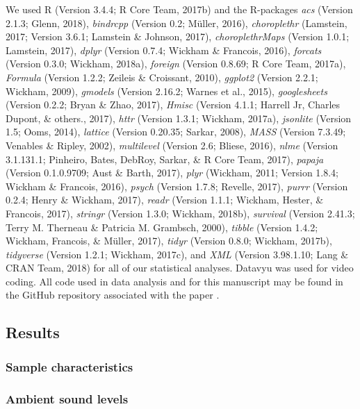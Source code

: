 \documentclass[english,man]{apa6}
\theoremstyle{definition}
\theoremstyle{definition}
\theoremstyle{definition}
\theoremstyle{remark}
\begin{document}
We used R (Version 3.4.4; R Core Team, 2017b) and the R-packages
\emph{acs} (Version 2.1.3; Glenn, 2018), \emph{bindrcpp} (Version 0.2;
Müller, 2016), \emph{choroplethr} (Lamstein, 2017; Version 3.6.1;
Lamstein \& Johnson, 2017), \emph{choroplethrMaps} (Version 1.0.1;
Lamstein, 2017), \emph{dplyr} (Version 0.7.4; Wickham \& Francois,
2016), \emph{forcats} (Version 0.3.0; Wickham, 2018a), \emph{foreign}
(Version 0.8.69; R Core Team, 2017a), \emph{Formula} (Version 1.2.2;
Zeileis \& Croissant, 2010), \emph{ggplot2} (Version 2.2.1; Wickham,
2009), \emph{gmodels} (Version 2.16.2; Warnes et al., 2015),
\emph{googlesheets} (Version 0.2.2; Bryan \& Zhao, 2017), \emph{Hmisc}
(Version 4.1.1; Harrell Jr, Charles Dupont, \& others., 2017),
\emph{httr} (Version 1.3.1; Wickham, 2017a), \emph{jsonlite} (Version
1.5; Ooms, 2014), \emph{lattice} (Version 0.20.35; Sarkar, 2008),
\emph{MASS} (Version 7.3.49; Venables \& Ripley, 2002),
\emph{multilevel} (Version 2.6; Bliese, 2016), \emph{nlme} (Version
3.1.131.1; Pinheiro, Bates, DebRoy, Sarkar, \& R Core Team, 2017),
\emph{papaja} (Version 0.1.0.9709; Aust \& Barth, 2017), \emph{plyr}
(Wickham, 2011; Version 1.8.4; Wickham \& Francois, 2016), \emph{psych}
(Version 1.7.8; Revelle, 2017), \emph{purrr} (Version 0.2.4; Henry \&
Wickham, 2017), \emph{readr} (Version 1.1.1; Wickham, Hester, \&
Francois, 2017), \emph{stringr} (Version 1.3.0; Wickham, 2018b),
\emph{survival} (Version 2.41.3; Terry M. Therneau \& Patricia M.
Grambsch, 2000), \emph{tibble} (Version 1.4.2; Wickham, Francois, \&
Müller, 2017), \emph{tidyr} (Version 0.8.0; Wickham, 2017b),
\emph{tidyverse} (Version 1.2.1; Wickham, 2017c), and \emph{XML}
(Version 3.98.1.10; Lang \& CRAN Team, 2018) for all of our statistical
analyses. Datavyu \cite{datavyu} was used for video coding. All code
used in data analysis and for this manuscript may be found in the GitHub
repository associated with the paper \cite{github.paper}.

\subsection{Results}\label{results}

\subsubsection{Sample characteristics}\label{sample-characteristics}

\subsubsection{Ambient sound levels}\label{ambient-sound-levels}
\end{document}

